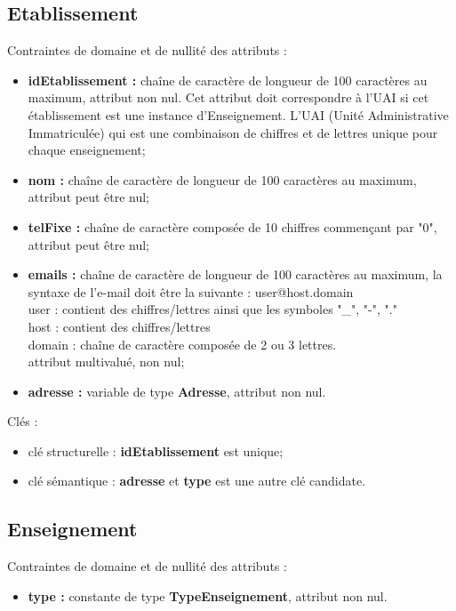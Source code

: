 \documentclass[asi, sansVersion]{picInsa}
\begin{document}
\subsection*{Etablissement}
Contraintes de domaine et de nullité des attributs :
\begin{itemize}
 	\item \textbf{idEtablissement :} chaîne de caractère de longueur de 100 caractères au maximum, attribut non nul. Cet attribut doit correspondre à l'UAI si cet établissement est une instance d'Enseignement. L'UAI (Unité Administrative Immatriculée) qui est une combinaison de chiffres et de lettres unique pour chaque enseignement;
	\item \textbf{nom :} chaîne de caractère de longueur de 100 caractères au maximum, attribut peut être nul;
	\item \textbf{telFixe :} chaîne de caractère composée de 10 chiffres commençant par "0", attribut peut être nul;
	\item \textbf{emails :} chaîne de caractère de longueur de 100 caractères au maximum, la syntaxe de l'e-mail doit être la suivante : user@host.domain\\
	user : contient des chiffres/lettres ainsi que les symboles "\_", "-", "." \\
	host : contient des chiffres/lettres \\
	domain : chaîne de caractère composée de 2 ou 3 lettres. \\
	attribut multivalué, non nul; 
	\item \textbf{adresse :} variable de type \textbf{Adresse}, attribut non nul.\\
\end{itemize}  

Clés : 
\begin{itemize}
\item clé structurelle : \textbf{idEtablissement} est unique;
\item clé sémantique : \textbf{adresse} et \textbf{type} est une autre clé candidate. \\ 
\end{itemize}

\subsection*{Enseignement}
Contraintes de domaine et de nullité des attributs :
\begin{itemize}
	\item \textbf{type :} constante de type \textbf{TypeEnseignement}, attribut non nul.\\
\end{itemize}
\end{document}

